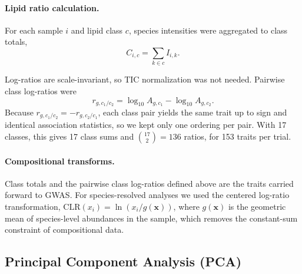 \documentclass[9pt,twocolumn,twoside]{rilabRxiv}
\begin{document}
\paragraph{Lipid ratio calculation.}
For each sample $i$ and lipid class $c$, species intensities were aggregated to class totals,
\[
C_{i,c}=\sum_{k \in c} I_{i,k}.
\]

Log-ratios are scale-invariant, so TIC normalization was not needed. 
 Pairwise class log-ratios were
\[
r_{g,c_1/c_2}=\log_{10}A_{g,c_1}-\log_{10}A_{g,c_2}.
\]
Because $r_{g,c_1/c_2}=-r_{g,c_2/c_1}$, each class pair yields the same trait up to sign and identical association statistics, so we kept only one ordering per pair. With 17 classes, this gives 17 class sums and $\binom{17}{2}=136$ ratios, for 153 traits per trial.

\paragraph{Compositional transforms.}
Class totals and the pairwise class log-ratios defined above are the traits carried forward to GWAS. For species-resolved analyses we used the centered log-ratio transformation, $\mathrm{CLR}(x_i)=\ln(x_i/g(\mathbf{x}))$, where $g(\mathbf{x})$ is the geometric mean of species-level abundances in the sample, which removes the constant-sum constraint of compositional data.



\subsection*{Principal Component Analysis (PCA)}
\end{document}

